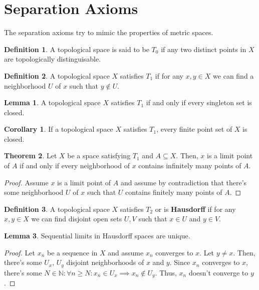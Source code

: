 \documentclass{article}
\theoremstyle{definition}
\newtheorem{definition}{Definition}
\newtheorem{theorem}{Theorem}[section]
\newtheorem{lemma}[theorem]{Lemma}
\newtheorem{corollary}{Corollary}[theorem]
\newcommand{\N}{\mathbb{N}}
\begin{document}
\newpage

\section{Separation Axioms}

The separation axioms try to mimic the properties of metric spaces.

\begin{definition}
    A topological space is said to be $T_{0}$ if any two distinct points in $X$ are topologically distinguisable.
\end{definition}

\begin{definition}
    A topological space $X$ satisfies $T_{1}$ if for any $x,y \in X$ we can find 
    a neighborhood $U$ of $x$ such that $y \notin U$.
\end{definition}

\begin{lemma}
    A topological space $X$ satisfies $T_{1}$ if and only if every singleton set is closed.
\end{lemma}

\begin{corollary}
    If a topological space $X$ satisfies $T_{1}$, every finite point set of $X$ is closed.
\end{corollary}

\begin{theorem}
    Let $X$ be a space satisfying $T_{1}$ and $A \subseteq X$. Then, $x$ is a
    limit point of $A$ if and only if every neighborhood of $x$ contains 
    infinitely many points of $A$.
\end{theorem}
\begin{proof}
    Assume $x$ is a limit point of $A$ and assume by contradiction that there's
    some neighborhood $U$ of $x$ such that $U$ contains finitely many points of $A$.
\end{proof}

\begin{definition}
    A topological space $X$ satisfies $T_{2}$ or is \textbf{Hausdorff} if for any $x,y \in X$ we can find disjoint open
    sets $U,V$ such that $x \in U$ and $y \in V$.
\end{definition}

\begin{lemma}
    Sequential limits in Hausdorff spaces are unique.
\end{lemma}
\begin{proof}
    Let $x_{n}$ be a sequence in $X$ and assume $x_{n}$ converges to $x$. Let $y \neq x$.
    Then, there's some $U_{x}$, $U_{y}$ disjoint neighborhoods of $x$ and $y$. Since $x_{n}$
    converges to $x$, there's some $N \in \N: \forall n \geq N: x_{n} \in U_{x} \implies x_{n} \notin U_{y}$.
    Thus, $x_{n}$ doesn't converge to $y$.
\end{proof}
\end{document}
